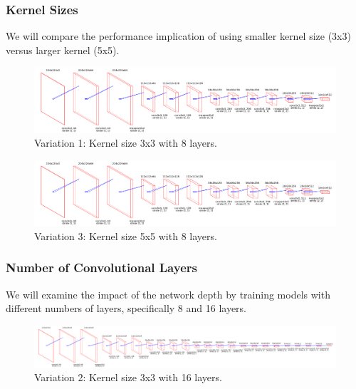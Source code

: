 \documentclass[conference]{IEEEtran}
\begin{document}
\subsubsection{Kernel Sizes}
We will compare the performance implication of using smaller kernel size (3x3) versus larger kernel (5x5).


\begin{figure}[htbp]
    \centerline{\includegraphics[width=1\linewidth]{latex/images/8_conv_layers_3x3Filters_noFlat.png}}
    \caption{Variation 1: Kernel size 3x3 with 8 layers.}
    \label{var1}
\end{figure}


\begin{figure}[htbp]
    \centerline{\includegraphics[width=1\linewidth]{latex/images/8_conv_layers_5x5Filters_noFlat.png}}
    \caption{Variation 3: Kernel size 5x5 with 8 layers.}
    \label{var2}
\end{figure}

\subsubsection{Number of Convolutional Layers} 
We will examine the impact of the network depth by training models with different numbers of layers, specifically 8 and 16 layers. 

\begin{figure}[htbp]
    \centerline{\includegraphics[width=1\linewidth]{latex/images/16_conv_layers_3x3Filters_noFlat.png}}
    \caption{Variation 2: Kernel size 3x3 with 16 layers.}
    \label{var3}
\end{figure}
\end{document}
